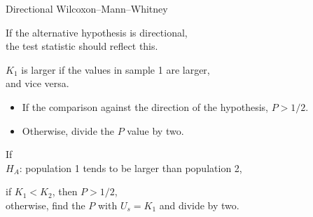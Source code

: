 \begin{frame}{Directional Wilcoxon--Mann--Whitney}

  If the alternative hypothesis is \alert{directional}, \\
    the test statistic should reflect this.

    \vspace{2em}

     $K_1$ is larger if the values in sample 1 are larger, \\
    \hspace{2em} and vice versa.

    \vspace{2em}

    \begin{itemize}
      \item If the comparison against the direction of the hypothesis, $P>1/2$.
      \item Otherwise, divide the $P$ value by two.
    \end{itemize}

    \vspace{2em}


      If \\
    $H_A$: population 1 tends to be larger than population 2, 
    
    \vspace{1em}

    \hspace{2em} if $K_1 < K_2$, then $P>1/2$, \\
    \hspace{2em} otherwise, find the $P$ with $U_s = K_1$ and divide by two.

\end{frame}

